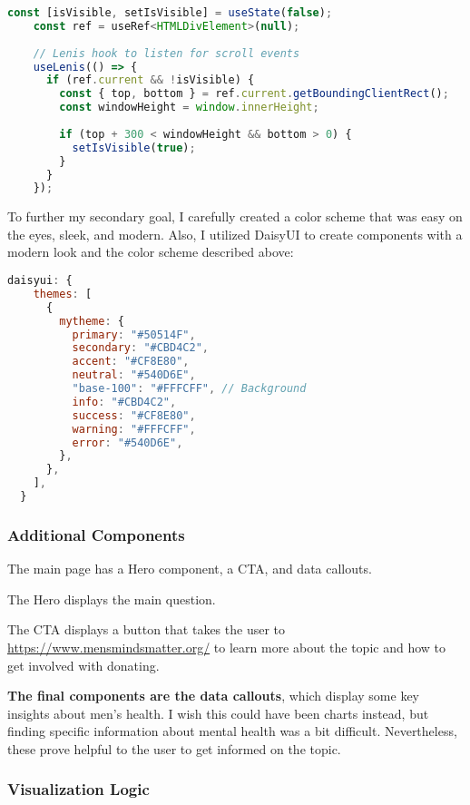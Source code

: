\documentclass{article}
\begin{document}
\begin{lstlisting}[language=JavaScript]
const [isVisible, setIsVisible] = useState(false);
    const ref = useRef<HTMLDivElement>(null);
  
    // Lenis hook to listen for scroll events
    useLenis(() => {
      if (ref.current && !isVisible) {
        const { top, bottom } = ref.current.getBoundingClientRect();
        const windowHeight = window.innerHeight;
  
        if (top + 300 < windowHeight && bottom > 0) {
          setIsVisible(true);
        }
      }
    });
\end{lstlisting}

To further my secondary goal, I carefully created a color scheme that was
easy on the eyes, sleek, and modern. Also, I utilized DaisyUI to create 
components with a modern look and the color scheme described above:

\begin{lstlisting}[language=JavaScript]
  daisyui: {
    themes: [
      {
        mytheme: {
          primary: "#50514F",
          secondary: "#CBD4C2",
          accent: "#CF8E80",
          neutral: "#540D6E",
          "base-100": "#FFFCFF", // Background
          info: "#CBD4C2",
          success: "#CF8E80",
          warning: "#FFFCFF",
          error: "#540D6E",
        },
      },
    ],
  }
\end{lstlisting}

\subsubsection{Additional Components}
\label{subsubsec:Components}

The main page has a Hero component, a CTA, and data callouts.

The Hero displays the main question.

The CTA displays a button that takes the user to 
\url{https://www.mensmindsmatter.org/} to learn more about the topic
and how to get involved with donating.

\textbf{The final components are the data callouts}, which display some key insights
about men's health. I wish this could have been charts instead,
but finding specific information about mental health was a bit difficult.
Nevertheless, these prove helpful to the user to get informed on the topic.

\subsubsection{Visualization Logic}
\label{subsubsec:Visualization Logic}
\end{document}
